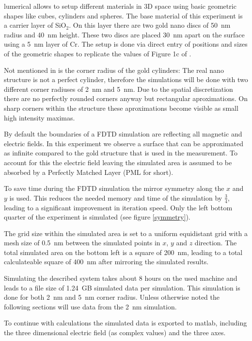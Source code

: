 lumerical allows to setup different materials in 3D space using basic geometric shapes like cubes, cylinders and spheres. The base material of this experiment is a carrier layer of SiO$_2$. On this layer there are two gold nano discs of \SI{50}{nm} radius and \SI{40}{nm} height. These two discs are placed \SI{30}{nm} apart on the surface using a \SI{5}{nm} layer of Cr. The setup is done via direct entry of positions and sizes of the geometric shapes to replicate the values of Figure 1c of \cite{heeg}.

Not mentioned in \cite{heeg} is the corner radius of the gold cylinders: The real nano structure is not a perfect cylinder, therefore the simulations will be done with two different corner radiuses of \SI{2}{nm} and \SI{5}{nm}. Due to the spatial discretization there are no perfectly rounded corners anyway but rectangular aproximations. On sharp corners within the structure these aproximations become visible as small high intensity maximas.

By default the boundaries of a FDTD simulation are reflecting all magnetic and electric fields. In this experiment we observe a surface that can be approximated as infinite compared to the gold structure that is used in the measurement. To account for this the electric field leaving the simulated area is assumed to be absorbed by a Perfectly Matched Layer (PML for short).

To save time during the FDTD simulation the mirror symmetry along the $x$ and $y$ is used. This reduces the needed memory and time of the simulation by $\frac{3}{4}$, leading to a significant improvement in iteration speed. Only the left bottom quarter of the experiment is simulated (see figure \ref{symmetry}).

The grid size within the simulated area is set to a uniform equidistant grid with a mesh size of \SI{0.5}{nm} between the simulated points in $x$, $y$ and $z$ direction. The total simulated area on the bottom left is a square of \SI{200}{nm}, leading to a total calculateable square of \SI{400}{nm} after mirroring the simulated results.

Simulating the described system takes about 8 hours on the used machine and leads to a file size of \SI{1.24}{GB} simulated data per simulation. This simulation is done for both \SI{2}{nm} and \SI{5}{nm} corner radius. Unless otherwise noted the following sections will use data from the \SI{2}{nm} simulation.

To continue with calculations the simulated data is exported to matlab, including the three dimensional electric field (as complex values) and the three axes.
